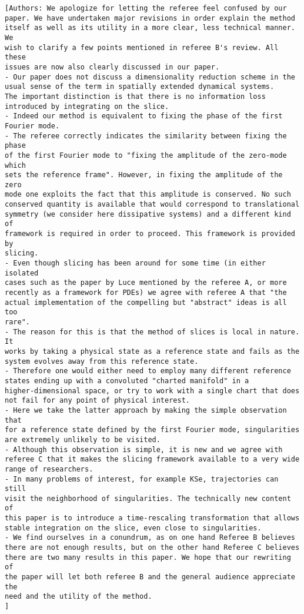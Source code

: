 {\begin{verbatim}
[Authors: We apologize for letting the referee feel confused by our
paper. We have undertaken major revisions in order explain the method
itself as well as its utility in a more clear, less technical manner. We
wish to clarify a few points mentioned in referee B's review. All these
issues are now also clearly discussed in our paper.
- Our paper does not discuss a dimensionality reduction scheme in the
usual sense of the term in spatially extended dynamical systems.
The important distinction is that there is no information loss
introduced by integrating on the slice.
- Indeed our method is equivalent to fixing the phase of the first
Fourier mode.
- The referee correctly indicates the similarity between fixing the phase
of the first Fourier mode to "fixing the amplitude of the zero-mode which
sets the reference frame". However, in fixing the amplitude of the zero
mode one exploits the fact that this amplitude is conserved. No such
conserved quantity is available that would correspond to translational
symmetry (we consider here dissipative systems) and a different kind of
framework is required in order to proceed. This framework is provided by
slicing.
- Even though slicing has been around for some time (in either isolated
cases such as the paper by Luce mentioned by the referee A, or more
recently as a framework for PDEs) we agree with referee A that "the
actual implementation of the compelling but "abstract" ideas is all too
rare".
- The reason for this is that the method of slices is local in nature. It
works by taking a physical state as a reference state and fails as the
system evolves away from this reference state.
- Therefore one would either need to employ many different reference
states ending up with a convoluted "charted manifold" in a
higher-dimensional space, or try to work with a single chart that does
not fail for any point of physical interest.
- Here we take the latter approach by making the simple observation that
for a reference state defined by the first Fourier mode, singularities
are extremely unlikely to be visited.
- Although this observation is simple, it is new and we agree with
referee C that it makes the slicing framework available to a very wide
range of researchers.
- In many problems of interest, for example KSe, trajectories can still
visit the neighborhood of singularities. The technically new content of
this paper is to introduce a time-rescaling transformation that allows
stable integration on the slice, even close to singularities.
- We find ourselves in a conundrum, as on one hand Referee B believes
there are not enough results, but on the other hand Referee C believes
there are two many results in this paper. We hope that our rewriting of
the paper will let both referee B and the general audience appreciate the
need and the utility of the method.
]


\end{verbatim}}
